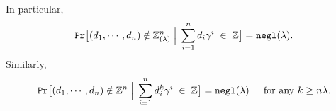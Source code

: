\documentclass[11pt, lettersize, notitlepage, leqno, footskip=0.6cm]{article}
\newcommand{\bz}{\mathbb Z}
\newcommand{\bq}{\mathbb Q}
\newcommand{\slim}{\sum\limits}
\newcommand{\ttt}{\texttt}
\newcommand{\negl}{\ttt{{negl}}}
\newcommand{\wti}{\widetilde}
\newcommand{\mb}{\mathbb}
\newcommand{\mbf}{\mathbf}
\newcommand{\lam}{\lambda}
\newcommand{\lamb}{\lambda}
\newcommand{\bzlam}{\bz_{(\lam)}}
\newcommand{\Prob}{\ttt{Pr}}
\newcommand{\vs}{\vspace{-0.15cm}}
\newcommand{\noin}{\noindent}
\newcommand{\op}{overwhelming probability}
\newcommand{\Mod}[1]{\ (\mathrm{mod}\ #1)}
\numberwithin{equation}{section}
\begin{document}
\begin{comment} 


\noin $\mbf{2}$. For rationals $d_1,\cdots, d_n\in \bq$ and a randomly generated $\lam$-bit integer $\gamma$, if \vs $$\slim_{i=1}^n d_i^{n\lam}\gamma^i\; \in \;\bz,$$ with \op, $(d_1,\cdots, d_n)\in \bz^n$.



\noin $\mbf{2}$. Let $D$ be the least common denominator for $d_1,\cdots, d_n$ and write $d_i = \frac{c_i}{D}$ for $i=1,\cdots, n.$ Suppose, by way of contradiction that $(d_1^{n\lam},\cdots, d_n^{n\lam} )\notin \bz^n$ and let $p$ be a prime dividing $D$. Then $$\slim_{i=1}^n c_i^{n\lam}\gamma^i \equiv 0\Mod{p^{n\lam}}.$$ Now, the polynomial $f(X):= \slim_{i=1}^n c_i^{n\lam} X^i$ has degree $n$ and by the preceding lemma, \vs $$\ttt{Pr}\big[h(\gamma)\equiv 0\Mod{p^{n\lam}} \big] = \negl(\lam).$$ Thus, with \op, the rationals $d_i^{n\lam}$ are integers, which in turn implies that the $d_i$ are integers. \end{comment}



\begin{comment}
For the second part, note that \vs $$\Prob\big(\sum\limits_{i=1}^n d_i\gamma_j^i\in \bz\;\forall j\big|\; (d_1,\cdots,d_n)\notin \bz\big ) = \Prob\big(\sum\limits_{i=1}^n d_i\gamma^i\in \bz\big|\; (d_1,\cdots,d_n)\notin \bz\big )^{\lam} = \negl(\lam).$$\end{comment}

\noin In particular, \vs $$\ttt{Pr}\big[(d_1,\cdots, d_n)\notin \bzlam^n \;\Big|\;\sum\limits_{i=1}^n d_i\gamma^i\; \in \;\bz \big] = \negl(\lamb).\vs $$ Similarly, \vs $$ \ttt{Pr}\big[(d_1,\cdots, d_n)\notin \bz^n \;\Big|\;\sum\limits_{i=1}^n d_i^{k}\gamma^i\; \in \;\bz \big] = \negl(\lamb)\;\;\;\;\text{ for any } k\geq n\lam. \vs $$



\begin{comment}In a setting where the Verifier is not satisfied with the elements $d_1,\cdots, d_n$ being $\bzlam$-integers and needs a probabilistic proof that they are, in fact, rational integers, the Prover could demonstrate that $\sum\limits_{i=1}^n d_i^{n\lam}\gamma^i\in \bz$. The resulting trade-off is a higher computational burden for the Prover. Computing \vs $$\wti{g} := g^{\slim_{i=1}^n d_i^{n\lam} \gamma^i}$$ entails \vs $$\mbf{O}\big(\log(\slim_{i=1}^n d_i^{n\lam} \gamma^i)\big) = \mbf{O}\big(n\lam\log(n)\max\{\log(d_i)\}\big) $$\vs squarings and products in $\mb{G}$. On the other hand, computing $g^{\slim_{i=1}^n d_i \gamma^i}$ entails \vs $$\mbf{O}\big(\log(\slim_{i=1}^n d_i\gamma^i)\big) = \mbf{O}\big(\log(n)\max\{\log(d_i)\}) \big)$$ \vs group squarings and products. Given a randomly generated element $g\in \mb{G}$, if the Prover outputs an element $\wti{g} ,$ the fractional root assumption implies that $\sum\limits_{i=1}^n d_i^{n\lam}\gamma^i\in \bz$ except with negligible probability. lemma \ref{integers} then implies that with \op, $(d_1,\cdots,d_n)\in \bz^n$.\end{comment}
\end{document}
